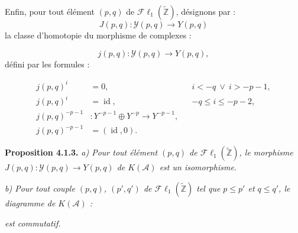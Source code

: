 \clearpage
{}%
\begingroup\small\setlength{\parskip}{0pt}\setlength{\emergencystretch}{1.5em}
\setlength{\abovedisplayskip}{4pt plus 2pt minus 2pt}%
\setlength{\belowdisplayskip}{4pt plus 2pt minus 2pt}%

Enfin, pour tout élément $(p,q)$ de
$\mathcal{F}\ell_1(\widetilde{\mathbb Z})$, désignons par :
\begin{equation}
J(p,q)\colon\mathcal Y(p,q)\longrightarrow Y(p,q)
\tag{4.1.2.9}
\end{equation}
la classe d'homotopie du morphisme de complexes :

\begin{equation}
j(p,q)\colon\mathcal Y(p,q)\longrightarrow Y(p,q),
\tag{4.1.2.10}
\end{equation}
défini par les formules :

\begin{equation}
\begin{aligned}
j(p,q)^i&=0,
  &&i<-q\ \lor\ i>-p-1,\\
j(p,q)^i&=\operatorname{id},
  &&-q\leq i\leq-p-2,\\
j(p,q)^{-p-1}&\colon
  Y^{-p-1}\oplus Y^{-p}\longrightarrow Y^{-p-1},\\
j(p,q)^{-p-1}&=(\operatorname{id},0).
\end{aligned}
\tag{4.1.2.11}
\end{equation}

\medskip\noindent\textbf{Proposition 4.1.3.}\quad
\textit{a) Pour tout élément $(p,q)$ de
$\mathcal{F}\ell_1(\widetilde{\mathbb Z})$, le morphisme
$J(p,q)\colon\mathcal Y(p,q)\longrightarrow Y(p,q)$ de $K(\mathcal A)$
est un isomorphisme.}

\noindent\textit{b) Pour tout couple $(p,q)$, $(p',q')$ de
$\mathcal{F}\ell_1(\widetilde{\mathbb Z})$ tel que $p\leq p'$ et
$q\leq q'$, le diagramme de $K(\mathcal A)$ :}

\begin{center}
\end{center}
\noindent\textit{est commutatif.}

